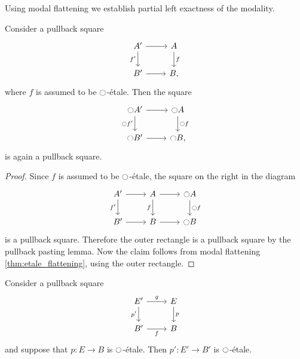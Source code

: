 Using modal flattening we establish partial left exactness of the modality.

\begin{cor}\label{cor:etale_lex}
Consider a pullback square
\begin{equation*}
\begin{tikzcd}
A' \arrow[d,swap,"{f'}"] \arrow[r] & A \arrow[d,"f"] \\
B' \arrow[r] & B,
\end{tikzcd}
\end{equation*}
where $f$ is assumed to be ${\ocircle}$-\'etale. Then the square
\begin{equation*}
\begin{tikzcd}
\modal A' \arrow[d,swap,"{\modal f'}"] \arrow[r] & \modal A \arrow[d,"\modal f"] \\
\modal B' \arrow[r] & \modal B,
\end{tikzcd}
\end{equation*}
is again a pullback square.
\end{cor}

\begin{proof}
Since $f$ is assumed to be ${\ocircle}$-\'etale, the square on the right in the diagram
\begin{equation*}
\begin{tikzcd}
A' \arrow[r] \arrow[d,swap,"{f'}"] & A \arrow[r] \arrow[d,swap,"f"] & \modal A \arrow[d,"\modal f"] \\
B' \arrow[r] & B \arrow[r] & \modal B
\end{tikzcd}
\end{equation*}
is a pullback square. Therefore the outer rectangle is a pullback square by the pullback pasting lemma. Now the claim follows from modal flattening \cref{thm:etale_flattening}, using the outer rectangle.
\end{proof}

\begin{cor}\label{cor:etale_pb}
Consider a pullback square
\begin{equation*}
\begin{tikzcd}
E' \arrow[d,swap,"{p'}"] \arrow[r,"g"] & E \arrow[d,"p"] \\
B' \arrow[r,swap,"f"] & B
\end{tikzcd}
\end{equation*} 
and suppose that $p:E\to B$ is ${\ocircle}$-\'etale. Then $p':E'\to B'$ is ${\ocircle}$-\'etale.
\end{cor}

